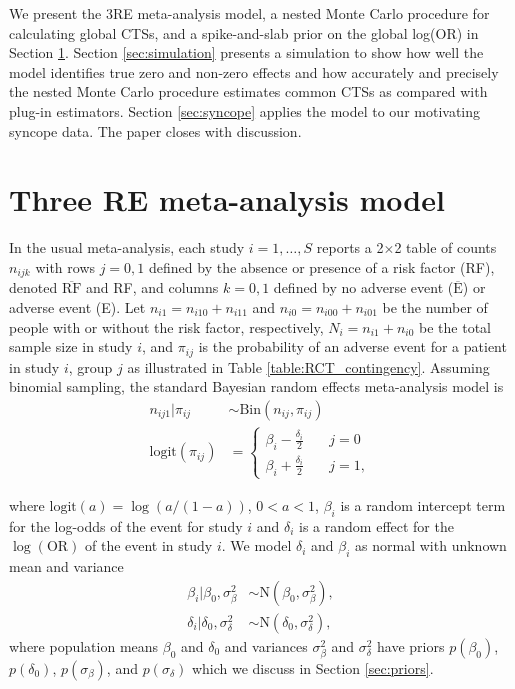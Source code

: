 \documentclass[AMA,STIX1COL]{WileyNJD-v2}
\newcommand{\Ebar}{\overline{\mbox{E}}}
\newcommand{\RFbar}{\overline{\mbox{RF}}}
\begin{document}
We present the 3RE meta-analysis model, a nested Monte Carlo procedure for calculating global CTSs, and a spike-and-slab prior on the global log(OR) in Section \ref{sec:3REmodel}. Section \ref{sec:simulation} presents a simulation to show how well the model identifies true zero and non-zero effects and how accurately and precisely the nested Monte Carlo procedure estimates common CTSs as compared with plug-in estimators. Section \ref{sec:syncope} applies the model to our motivating syncope data. The paper closes with discussion. 

\section{Three RE meta-analysis model} \label{sec:3REmodel}

In the usual meta-analysis, each study $i = 1, \dots, S$ reports a 2$\times$2 table of counts $n_{ijk}$ with rows $j = 0, 1$ defined by the absence or presence of a risk factor (RF), denoted $\RFbar$ and RF, and columns $k = 0, 1$ defined by no adverse event ($\Ebar$) or adverse event (E). Let $n_{i1} = n_{i10} + n_{i11}$ and $n_{i0} = n_{i00} + n_{i01}$ be the number of people with or without the risk factor, respectively,  $N_i = n_{i1} + n_{i0}$ be the total sample size in study $i$, and $\pi_{ij}$ is the probability of an adverse event for a patient in study $i$, group $j$ as illustrated in Table \ref{table:RCT_contingency}. Assuming binomial sampling, the standard Bayesian random effects meta-analysis model is 
\begin{align}
n_{ij1} \vert \pi_{ij} & \sim \mbox{Bin}(n_{ij}, \pi_{ij})  \label{eq:likelihood}\\
\mbox{logit}(\pi_{ij}) & =  \left\{
                  \begin{array}{ll}
                    \beta_{i} - \frac{\delta_i}{2} & \quad j=0 \\ 
                    \beta_{i} + \frac{\delta_i}{2} & \quad j=1,
                  \end{array}
                \right. \label{eq:logit}
\end{align}

\noindent where $\mbox{logit}(a) = \log(a/(1-a))$, $0 < a < 1$, $\beta_i$ is a random intercept term for the log-odds of the event for study $i$ and $\delta_i$ is a random effect for the $\log(\mbox{OR})$ of the event in study $i$. We model $\delta_i$ and $\beta_i$ as normal with unknown mean and variance
\begin{align}
\beta_i \vert \beta_0, \sigma^2_{\beta} & \sim \mbox{N}(\beta_0, \sigma^2_{\beta}), \label{eq:betai} \\
\delta_i \vert \delta_0, \sigma^2_{\delta} & \sim \mbox{N}(\delta_0, \sigma^2_{\delta}), \label{eq:deltai} 
\end{align}
\noindent where population means $\beta_0$ and $\delta_0$ and variances $\sigma^2_{\beta}$ and $\sigma^2_{\delta}$ have priors $p(\beta_0)$, $p(\delta_0)$, $p(\sigma_{\beta})$, and $p(\sigma_{\delta})$ which we discuss in Section \ref{sec:priors}. 
\end{document}

